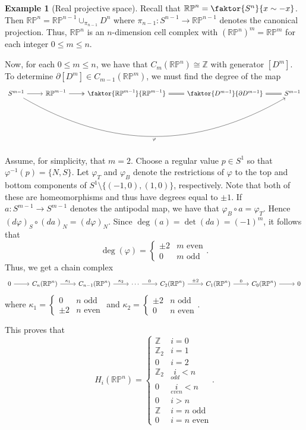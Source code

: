 \documentclass[10pt,letterpaper,cm]{nupset}
\theoremstyle{definition}
\newtheorem{exmp}[defn]{Example}
\theoremstyle{theorem}
\theoremstyle{remark}
\newcommand{\RP}{\mathbb{RP}}
\newcommand{\Z}{\mathbb Z}
\newcommand{\1}{\mathbb{1}}
\newcommand{\0}{\vec 0}
\begin{document}
\begin{exmp}[Real projective space]
Recall that $\RP^n = \faktor{S^n}{x \sim {-}x}$. Then $\RP^n = \RP^{n-1} \cup_{\pi_{n-1}} D^n$ where $\pi_{n-1} : S^{n-1} \to \RP^{n-1}$ denotes the canonical projection. Thus, $\RP^n$ is an $n$-dimension cell complex with $(\RP^n)^m = \RP^m$ for each integer $0\leq m\leq n$.

\medskip

Now, for each $0\leq m \leq n$, we have that $C_m(\RP^n) \cong \Z$ with generator $[D^m]$. To determine $\partial[D^m]\in C_{m-1}(\RP^m)$, we must find the degree of the map
\[
\begin{tikzcd}
S^{m-1} \arrow[rrrr, "\varphi"', bend right] \arrow[r] & \RP^{m-1} \arrow[r, two heads] & \faktor{\RP^{m-1}}{\RP^{m-1}} \arrow[r, equals] & \faktor{D^{m-1}}{\partial{D^{m-1}}} \arrow[r, equals] & S^{m-1}
\end{tikzcd}
\]
Assume, for simplicity, that $m=2$. Choose a regular value $p\in S^{1}$ so that $\varphi^{-1}(p) = \{N, S\}$. Let $\varphi_T$ and $\varphi_B$ denote the restrictions of $\varphi$ to the top and bottom components of $S^1 \setminus \{({-}1, 0), (1,0)\}$, respectively. Note that both of these are homeomorphisms and thus have degrees equal to $\pm 1$. If $a: S^{m-1} \to S^{m-1}$ denotes the antipodal map, we have that $\varphi_B \circ a= \varphi_T$. Hence $(d{\varphi})_S \circ (d{a})_N = (d{\varphi})_N$.  Since $\deg(a) = \det(d{a}) = ({-}1)^m$, it follows that $$\deg(\varphi) = \begin{cases} \pm 2 & m  \text{ even} \\ 0 & m \text{ odd} \end{cases}.$$
Thus, we get a chain complex
\[
\begin{tikzcd}
0 \arrow[r] & C_n(\RP^n) \arrow[r, "\kappa_1"] & C_{n-1}(\RP^n) \arrow[r, "\kappa_2"] & \cdots \arrow[r, "0"] & C_2(\RP^n) \arrow[r, "\pm 2"] & C_1(\RP^n) \arrow[r, "0"] & C_0(\RP^n) \arrow[r] & 0
\end{tikzcd}
\] where $\kappa_1 = \begin{cases} 0 & n \text{ odd} \\ \pm 2 & n \text{ even} \end{cases}$ and $\kappa_2 = \begin{cases} \pm 2 & n \text{ odd} \\ 0 & n \text{ even} \end{cases}$.

This proves that $$ H_i( \RP^n) = \begin{cases} \Z & i =0 \\ \Z_2 & i =1 \\ 0 & i =2 \\ \Z_2 & \underset{odd}{i} <n \\ 0 & \underset{even}{i} <n \\ 0 & i >n \\ \Z & i =n \text{ odd} \\ 0 & i= n \text{ even}    \end{cases}  .$$
\end{exmp}
\end{document}
